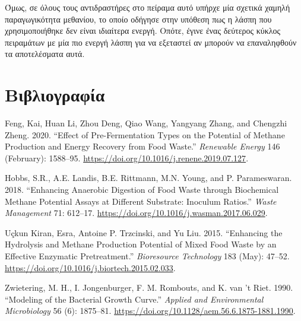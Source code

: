 \documentclass[11pt]{article}
\begin{document}
Όμως, σε όλους τους αντιδραστήρες στο πείραμα αυτό υπήρχε μία σχετικά χαμηλή παραγωγικότητα μεθανίου, το οποίο οδήγησε στην υπόθεση πως η λάσπη που χρησιμοποιήθηκε δεν είναι ιδιαίτερα ενεργή. Οπότε, έγινε ένας δεύτερος κύκλος πειραμάτων με μία πιο ενεργή λάσπη για να εξεταστεί αν μπορούν να επαναληφθούν τα αποτελέσματα αυτά.
\section{Βιβλιογραφία}
\label{sec:org511b220}
\begin{hangparas}{1.5em}{1}
\hypertarget{citeproc_bib_item_1}{Feng, Kai, Huan Li, Zhou Deng, Qiao Wang, Yangyang Zhang, and Chengzhi Zheng. 2020. “Effect of Pre-Fermentation Types on the Potential of Methane Production and Energy Recovery from Food Waste.” \textit{Renewable Energy} 146 (February): 1588–95. \url{https://doi.org/10.1016/j.renene.2019.07.127}.}

\hypertarget{citeproc_bib_item_2}{Hobbs, S.R., A.E. Landis, B.E. Rittmann, M.N. Young, and P. Parameswaran. 2018. “Enhancing Anaerobic Digestion of Food Waste through Biochemical Methane Potential Assays at Different Substrate: Inoculum Ratios.” \textit{Waste Management} 71: 612–17. \url{https://doi.org/10.1016/j.wasman.2017.06.029}.}

\hypertarget{citeproc_bib_item_3}{Uçkun Kiran, Esra, Antoine P. Trzcinski, and Yu Liu. 2015. “Enhancing the Hydrolysis and Methane Production Potential of Mixed Food Waste by an Effective Enzymatic Pretreatment.” \textit{Bioresource Technology} 183 (May): 47–52. \url{https://doi.org/10.1016/j.biortech.2015.02.033}.}

\hypertarget{citeproc_bib_item_4}{Zwietering, M. H., I. Jongenburger, F. M. Rombouts, and K. van ’t Riet. 1990. “Modeling of the Bacterial Growth Curve.” \textit{Applied and Environmental Microbiology} 56 (6): 1875–81. \url{https://doi.org/10.1128/aem.56.6.1875-1881.1990}.}\bigskip
\end{hangparas}
\end{document}
